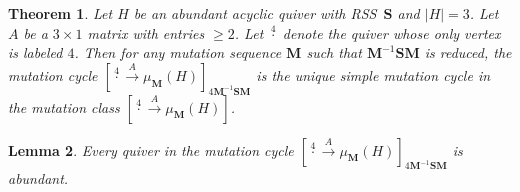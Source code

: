 \documentclass[11pt, letterpaper]{amsart}
\newtheorem{theorem}{Theorem}[section]
\newtheorem{lemma}[theorem]{Lemma}
\theoremstyle{definition}
\numberwithin{equation}{section}
\begin{document}
\begin{theorem}
\label{thm:4vertNoShortcut}
Let $H$ be an abundant acyclic quiver with RSS~$\mathbf S$ and $|H|=3$.
Let $A$ be a $3\times 1$ matrix with entries $\geq 2$.
Let $\stackrel{4}{\cdot}$ denote the quiver whose only vertex is labeled $4$. 
Then for any mutation sequence $\mathbf M$ such that $\mathbf M^{-1} \mathbf S \mathbf M$ is reduced, the mutation cycle $[\stackrel{4}{\cdot} \stackrel{A}{\rightarrow} \mu_{\mathbf M}(H)]_{4\mathbf M^{-1} \mathbf S \mathbf M}$ is the unique simple mutation cycle in the mutation class $[\stackrel{4}{\cdot} \stackrel{A}{\rightarrow} \mu_{\mathbf M}(H)]$.
\end{theorem}

\begin{lemma}
\label{lem:arrowsGrow}
Every quiver in the mutation cycle $[\stackrel{4}{\cdot} \stackrel{A}{\rightarrow} \mu_{\mathbf M}(H)]_{4 \mathbf M^{-1} \mathbf S \mathbf M}$ is abundant.
\end{lemma}
\end{document}
